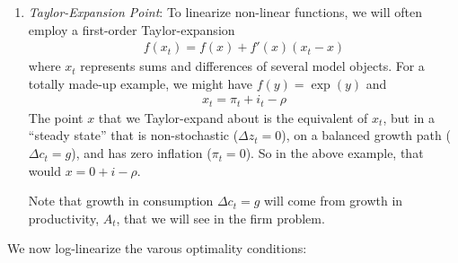 \documentclass[12pt]{article}
\theoremstyle{plain}
\theoremstyle{definition}
\theoremstyle{remark}
\begin{document}
\begin{enumerate}
  \item \emph{Taylor-Expansion Point}:
    To linearize non-linear functions, we will often employ a
    first-order Taylor-expansion
    \begin{align*}
      f(x_t) = f(x) + f'(x)(x_t-x)
    \end{align*}
    where $x_t$ represents sums and differences of several model
    objects. For a totally made-up example, we might have $f(y)=\exp(y)$
    and
    \begin{align*}
      x_t = \pi_t + i_t - \rho
    \end{align*}
    The point $x$ that we Taylor-expand about is the equivalent of
    $x_t$, but in a ``steady state'' that is non-stochastic ($\Delta
    z_t=0$), on a balanced growth path ($\Delta c_t =g$), and has zero
    inflation ($\pi_t=0$). So in the above example, that would
    $x=0+i-\rho$.

    Note that growth in consumption $\Delta c_t=g$ will come from growth
    in productivity, $A_t$, that we will see in the firm problem.
\end{enumerate}
We now log-linearize the varous optimality conditions:
\end{document}
